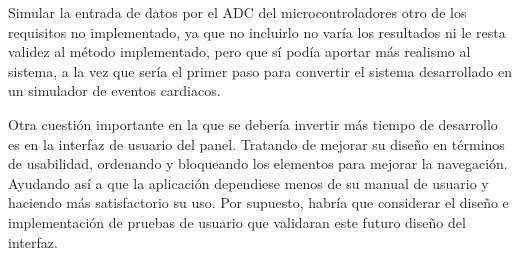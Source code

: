 Simular la entrada de datos por el ADC del microcontroladores otro de los requisitos no implementado,  ya que no incluirlo no varía los resultados ni le resta validez al método implementado, pero que sí podía aportar más realismo al sistema, a la vez que sería el primer paso para convertir el sistema desarrollado en un simulador de eventos cardiacos.

Otra cuestión importante en la que se debería invertir más tiempo de desarrollo es en la interfaz de usuario del panel. Tratando de mejorar su diseño en términos de usabilidad, ordenando y bloqueando los elementos para mejorar la navegación. Ayudando así a que la aplicación dependiese menos de su manual de usuario y haciendo más satisfactorio su uso. Por supuesto, habría que considerar el diseño e implementación de pruebas de usuario que validaran este futuro diseño del interfaz.

\chapterend
